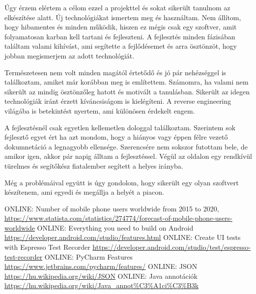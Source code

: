 \documentclass{thesis-ekf}
\theoremstyle{definition}
\theoremstyle{remark}
\begin{document}
Úgy érzem elértem a célom ezzel a projekttel és sokat sikerült tanulnom az elkészítése alatt.
Új technológiákat ismertem meg és használtam. Nem állítom, hogy hibamentes és minden működik, hiszen ez mégis csak egy szoftver, amit folyamatosan karban kell tartani és fejleszteni.
A fejlesztés minden fázisában találtam valami kihívást, ami segítette a fejlődésemet és arra ösztönzöt, hogy jobban megismerjem az adott technológiát.

Természetesen nem volt minden magától értetődő és jó pár nehézséggel is találkoztam, amiket már korábban meg is említettem.
Számomra, ha valami nem sikerült az mindig ösztönzőleg hatott és motivált a tanulásban. Sikerült az idegen technológiák iránt érzett kíváncsiságom is kielégíteni.
A reverse engineering világába is betekintést nyertem, ami különösen érdekelt engem. 

A fejlesztésnél csak egyetlen kellemetlen dologgal találkoztam. Szerintem sok fejlesztő egyet ért ha azt mondom, hogy a hiányos vagy éppen félre vezető dokumnetáció a legnagyobb ellensége.
Szerencsére nem sokszor futottam bele, de amikor igen, akkor pár napig álltam a fejlesztéssel. Végül az oldalon egy rendkívül türelmes és segítőkész fiatalember segített a helyes irányba. 

Még a problémáival együtt is úgy gondolom, hogy sikerült egy olyan szoftvert készítenem, ami egyedi és megállja a helyét a piacon. 


\begin{thebibliography}{1}
 \textsc{ONLINE}: Number of mobile phone users worldwide from 2015 to 2020, \url{https://www.statista.com/statistics/274774/forecast-of-mobile-phone-users-worldwide}
 \textsc{ONLINE}: Everything you need to build on Android \url{https://developer.android.com/studio/features.html}
 \textsc{ONLINE}: Create UI tests with Espresso Test Recorder \url{https://developer.android.com/studio/test/espresso-test-recorder}
 \textsc{ONLINE}: PyCharm Features \url{https://www.jetbrains.com/pycharm/features/}
 \textsc{ONLINE}: JSON \url{https://hu.wikipedia.org/wiki/JSON}
 \textsc{ONLINE}: Java annotációk \url{https://hu.wikipedia.org/wiki/Java_annot%C3%A1ci%C3%B3k}
\end{thebibliography}
\end{document}
